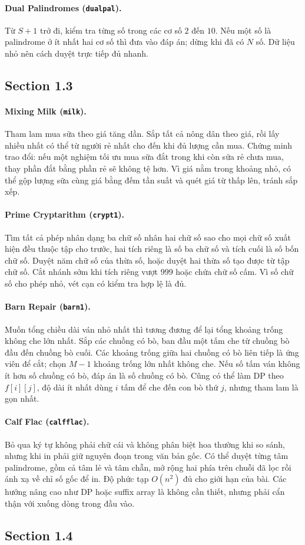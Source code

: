 \documentclass[11pt]{article}
\newcommand{\problem}[2]{\paragraph{#1 (\texttt{#2}).}}
\newcommand{\bigO}[1]{\ensuremath{O(#1)}}
\begin{document}
\problem{Dual Palindromes}{dualpal}
Từ \(S+1\) trở đi, kiểm tra từng số trong các cơ số \(2\) đến \(10\). Nếu một số là palindrome ở ít nhất hai cơ số thì đưa vào đáp án; dừng khi đã có \(N\) số. Dữ liệu nhỏ nên cách duyệt trực tiếp đủ nhanh.

\subsection*{Section 1.3}

\problem{Mixing Milk}{milk}
Tham lam mua sữa theo giá tăng dần. Sắp tất cả nông dân theo giá, rồi lấy nhiều nhất có thể từ người rẻ nhất cho đến khi đủ lượng cần mua. Chứng minh trao đổi: nếu một nghiệm tối ưu mua sữa đắt trong khi còn sữa rẻ chưa mua, thay phần đắt bằng phần rẻ sẽ không tệ hơn. Vì giá nằm trong khoảng nhỏ, có thể gộp lượng sữa cùng giá bằng đếm tần suất và quét giá từ thấp lên, tránh sắp xếp.

\problem{Prime Cryptarithm}{crypt1}
Tìm tất cả phép nhân dạng ba chữ số nhân hai chữ số sao cho mọi chữ số xuất hiện đều thuộc tập cho trước, hai tích riêng là số ba chữ số và tích cuối là số bốn chữ số. Duyệt năm chữ số của thừa số, hoặc duyệt hai thừa số tạo được từ tập chữ số. Cắt nhánh sớm khi tích riêng vượt \(999\) hoặc chứa chữ số cấm. Vì số chữ số cho phép nhỏ, vét cạn có kiểm tra hợp lệ là đủ.

\problem{Barn Repair}{barn1}
Muốn tổng chiều dài ván nhỏ nhất thì tương đương để lại tổng khoảng trống không che lớn nhất. Sắp các chuồng có bò, ban đầu một tấm che từ chuồng bò đầu đến chuồng bò cuối. Các khoảng trống giữa hai chuồng có bò liên tiếp là ứng viên để cắt; chọn \(M-1\) khoảng trống lớn nhất không che. Nếu số tấm ván không ít hơn số chuồng có bò, đáp án là số chuồng có bò. Cũng có thể làm DP theo \(f[i][j]\), độ dài ít nhất dùng \(i\) tấm để che đến con bò thứ \(j\), nhưng tham lam là gọn nhất.

\problem{Calf Flac}{calfflac}
Bỏ qua ký tự không phải chữ cái và không phân biệt hoa thường khi so sánh, nhưng khi in phải giữ nguyên đoạn trong văn bản gốc. Có thể duyệt từng tâm palindrome, gồm cả tâm lẻ và tâm chẵn, mở rộng hai phía trên chuỗi đã lọc rồi ánh xạ về chỉ số gốc để in. Độ phức tạp \(\bigO{n^2}\) đủ cho giới hạn của bài. Các hướng nâng cao như DP hoặc suffix array là không cần thiết, nhưng phải cẩn thận với xuống dòng trong đầu vào.

\subsection*{Section 1.4}
\end{document}
